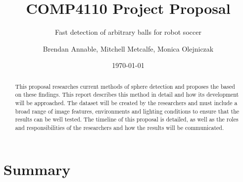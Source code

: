 \documentclass[11pt]{scrartcl}
\title{COMP4110 Project Proposal}
\subtitle{Fast detection of arbitrary balls for robot soccer}
\author{Brendan Annable, Mitchell Metcalfe, Monica Olejniczak}
\date{\today}
\begin{document}
	\maketitle

	\begin{abstract}
		This proposal researches current methods of sphere detection and proposes 
		the  based on these findings. This report 
		describes this method in detail and how its development will be 
		approached. The dataset will be created by the researchers and must 
		include a broad range of image features, environments and lighting 
		conditions to ensure that the results can be well tested. The timeline
		of this proposal is detailed, as well as the roles and responsibilities
		of the researchers and how the results will be communicated.
	\end{abstract}

	\newpage
	\tableofcontents
	\newpage

	\section{Summary} {

		
	}
\end{document}
